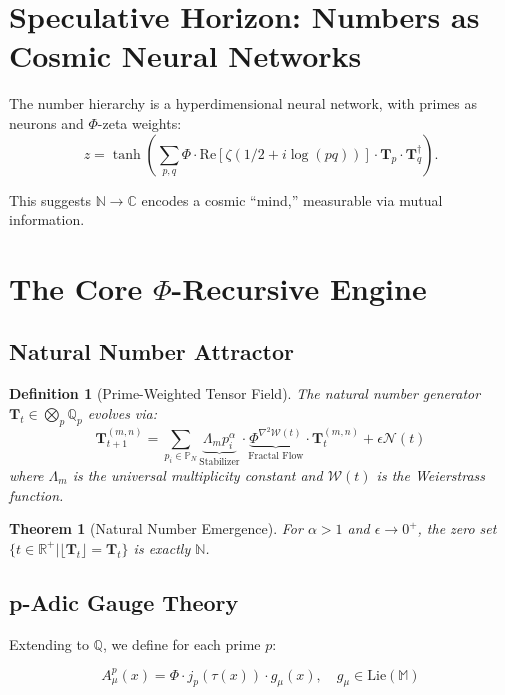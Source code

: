 \documentclass{article}
\theoremstyle{plain}
\newtheorem{theorem}{Theorem}
\newcommand{\N}{\mathbb{N}}
\newcommand{\Q}{\mathbb{Q}}
\newcommand{\R}{\mathbb{R}}
\newcommand{\P}{\mathbb{P}}
\newcommand{\T}{\mathbf{T}}
\newcommand{\M}{\mathbb{M}}
\newtheorem{definition}{Definition}
\begin{document}
\section{Speculative Horizon: Numbers as Cosmic Neural Networks}
\begin{conjecture}
The number hierarchy is a hyperdimensional neural network, with primes as neurons and $\Phi$-zeta weights:
\[
z = \tanh\left( \sum_{p,q} \Phi \cdot \text{Re}[\zeta(1/2 + i \log(pq))] \cdot \mathbf{T}_p \cdot \mathbf{T}_q^\dagger \right).
\]
\end{conjecture}
This suggests $\mathbb{N} \to \mathbb{C}$ encodes a cosmic “mind,” measurable via mutual information.

\section{The Core $\Phi$-Recursive Engine}

\subsection{Natural Number Attractor}

\begin{definition}[Prime-Weighted Tensor Field]
The natural number generator $\T_t \in \bigotimes_p \Q_p$ evolves via:
\begin{equation}
    \T_{t+1}^{(m,n)} = \sum_{p_i \in \P_N} \underbrace{\Lambda_m p_i^\alpha}_{\text{Stabilizer}} \cdot \underbrace{\Phi^{\nabla^2 \mathcal{W}(t)}}_{\text{Fractal Flow}} \cdot \T_t^{(m,n)} + \epsilon \mathcal{N}(t)
\end{equation}
where $\Lambda_m$ is the universal multiplicity constant and $\mathcal{W}(t)$ is the Weierstrass function.
\end{definition}

\begin{theorem}[Natural Number Emergence]
For $\alpha > 1$ and $\epsilon \to 0^+$, the zero set $\{t \in \R^+ | \lfloor \T_t \rfloor = \T_t\}$ is exactly $\N$.
\end{theorem}

\subsection{p-Adic Gauge Theory}

Extending to $\Q$, we define for each prime $p$:

\begin{equation}
    A_\mu^p(x) = \Phi \cdot j_p(\tau(x)) \cdot g_\mu(x), \quad g_\mu \in \text{Lie}(\M)
\end{equation}
\end{document}
